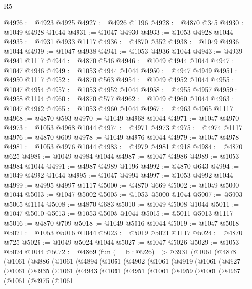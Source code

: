 \begin{lexlean}{R5}
\begin{coremodule}
@4926 := @4923 @4925
@4927 := @4926 @1196
@4928 := @4870 @345
@4930 := @1049 @4928 @1044
@4931 := @1047 @4930
@4933 := @1053 @4928 @1044
@4935 := @4931 @4933 @1117
@4936 := @4870 @352
@4938 := @1049 @4936 @1044
@4939 := @1047 @4938
@4941 := @1053 @4936 @1044
@4943 := @4939 @4941 @1117
@4944 := @4870 @546
@4946 := @1049 @4944 @1044
@4947 := @1047 @4946
@4949 := @1053 @4944 @1044
@4950 := @4947 @4949
@4951 := @4950 @1117
@4952 := @4870 @563
@4954 := @1049 @4952 @1044
@4955 := @1047 @4954
@4957 := @1053 @4952 @1044
@4958 := @4955 @4957
@4959 := @4958 @1104
@4960 := @4870 @577
@4962 := @1049 @4960 @1044
@4963 := @1047 @4962
@4965 := @1053 @4960 @1044
@4967 := @4963 @4965 @1117
@4968 := @4870 @593
@4970 := @1049 @4968 @1044
@4971 := @1047 @4970
@4973 := @1053 @4968 @1044
@4974 := @4971 @4973
@4975 := @4974 @1117
@4976 := @4870 @609
@4978 := @1049 @4976 @1044
@4979 := @1047 @4978
@4981 := @1053 @4976 @1044
@4983 := @4979 @4981 @4918
@4984 := @4870 @625
@4986 := @1049 @4984 @1044
@4987 := @1047 @4986
@4989 := @1053 @4984 @1044
@4991 := @4987 @4989 @1196
@4992 := @4870 @643
@4994 := @1049 @4992 @1044
@4995 := @1047 @4994
@4997 := @1053 @4992 @1044
@4999 := @4995 @4997 @1117
@5000 := @4870 @669
@5002 := @1049 @5000 @1044
@5003 := @1047 @5002
@5005 := @1053 @5000 @1044
@5007 := @5003 @5005 @1104
@5008 := @4870 @683
@5010 := @1049 @5008 @1044
@5011 := @1047 @5010
@5013 := @1053 @5008 @1044
@5015 := @5011 @5013 @1117
@5016 := @4870 @709
@5018 := @1049 @5016 @1044
@5019 := @1047 @5018
@5021 := @1053 @5016 @1044
@5023 := @5019 @5021 @1117
@5024 := @4870 @725
@5026 := @1049 @5024 @1044
@5027 := @1047 @5026
@5029 := @1053 @5024 @1044
@5072 := @4869
    (fun (__b : @926) =>
    @3931
      (@1061
        (@4878
          (@1061
            (@4886
              (@1061
                (@4894
                  (@1061
                    (@4902
                      (@1061
                        (@4919
                          (@1061
                            (@4927
                              (@1061
                                (@4935
                                  (@1061
                                    (@4943
                                      (@1061
                                        (@4951
                                          (@1061
                                            (@4959
                                              (@1061
                                                (@4967
                                                  (@1061
                                                    (@4975
                                                      (@1061

\end{coremodule}
\end{lexlean}
